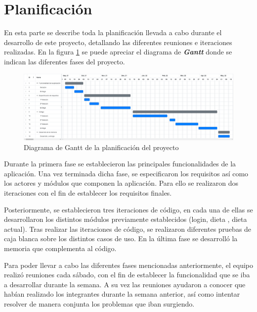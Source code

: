 \section{Planificación}
En esta parte se describe toda la planificación llevada a cabo durante el desarrollo de este proyecto, detallando las diferentes reuniones e iteraciones realizadas. En la figura \ref{fig:gantt} se puede apreciar el diagrama de \textbf{\textit{Gantt}} donde se indican las diferentes fases del proyecto.
\begin{figure}[H]
    \centering
    \includegraphics[width=\textwidth]{Images/gantt.png}
    \caption{Diagrama de Gantt de la planificación del proyecto}
    \label{fig:gantt}
\end{figure}

Durante la primera fase se establecieron las principales funcionalidades de la aplicación. Una vez terminada dicha fase, se especificaron los requisitos así como los actores y módulos que componen la aplicación. Para ello se realizaron dos iteraciones con el fin de establecer los requisitos finales.

Posteriormente, se establecieron tres iteraciones de código, en cada una de ellas se desarrollaron los distintos módulos previamente establecidos (login, dieta , dieta actual). Tras realizar las iteraciones de código, se realizaron diferentes pruebas de caja blanca sobre los distintos casos de uso. En la última fase se desarrolló la memoria que complementa al código.

Para poder llevar a cabo las diferentes fases mencionadas anteriormente, el equipo realizó reuniones cada sábado, con el fin de establecer la funcionalidad que se iba a desarrollar durante la semana. A su vez las reuniones ayudaron a conocer que habían realizado los integrantes durante la semana anterior, así como intentar resolver de manera conjunta los problemas que iban surgiendo.